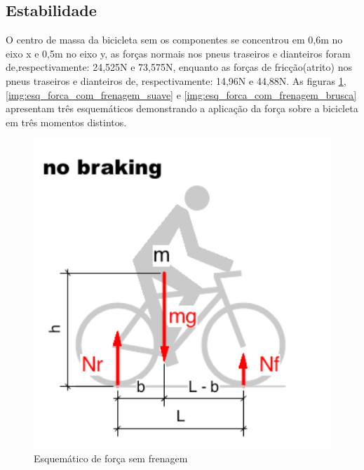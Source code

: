\newpage

	\subsection{Estabilidade}
	O centro de massa da bicicleta sem os componentes se concentrou em 0,6m no eixo x e 0,5m no eixo y, as forças normais nos pneus traseiros e dianteiros foram de,respectivamente: 24,525N e 73,575N, enquanto as forças de fricção(atrito)  nos pneus traseiros e dianteiros de, respectivamente: 14,96N e 44,88N. As figuras \ref{img:esq_forca_sem_frenagem}, \ref{img:esq_forca_com_frenagem_suave} e \ref{img:esq_forca_com_frenagem_brusca} apresentam três esquemáticos demonstrando a aplicação da força sobre a bicicleta em três momentos distintos.

\graphicspath{{figuras/}}
\begin{figure}[h!]
\centering
\includegraphics[scale=0.80]{esq_forca_sem_frenagem.png}
\caption{Esquemático de força sem frenagem}
\label{img:esq_forca_sem_frenagem}
\end{figure}

